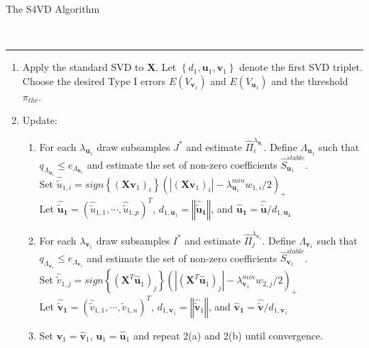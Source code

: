 \documentclass{bioinfo}
\begin{document}
\begin{methods}
\begin{bf}The S4VD Algorithm\end{bf}\\
\hspace{-0.1cm} 
\rule{8.5 cm}{1pt}
\begin{enumerate}
 \item Apply the standard SVD to $\mathbf{X}$. Let $\left\{ d_{1}, \mathbf{u}_{1}, \mathbf{v}_{1} \right\}$ denote the first SVD triplet. Choose the desired Type I errors $E(V_{\mathbf{v}_{1}})$ and $E(V_{\mathbf{u}_{1}})$ and the threshold $\pi_{thr}$.
 \item Update:
  \begin{enumerate}
   \item For each $\lambda_{\mathbf{u}_{1}}$ draw subsamples $J^{*}$ and estimate $\hat{\Pi}_{i}^{\lambda_{\mathbf{u}_{1}}}$.
	 Define $\Lambda_{\mathbf{u}_{1}}$ such that $q_{\Lambda_{\mathbf{u}_{1}}} \leq e_{\Lambda_{\mathbf{u}_{1}}}$ and estimate the set of non-zero coefficients
	 $\hat{S}_{\mathbf{u}_{1}}^{stable}$.\\
	 Set $\hat{\tilde{u}}_{1,i}=\textit{sign} \left\{(\mathbf{X}\mathbf{v}_{1})_{i} \right\} (|(\mathbf{X}\mathbf{v}_{1})_{i}|- \lambda^{min}_{\mathbf{u}_{1}}w_{1,i}/2)_{+} $ \\
	 Let $\mathbf{\hat{\tilde{u}}_{1}}=(\hat{\tilde{u}}_{1,1},\cdots,\hat{\tilde{u}}_{1,p})^{T}$,
	 $d_{1,\mathbf{u}_{1}}=\left\Vert \mathbf{\hat{\tilde{u}}_{1}} \right\Vert$, 
	 and $\mathbf{\hat{u}_{1}} =\mathbf{\hat{\tilde{u}}}/d_{1,\mathbf{u_{1}}}$
    \item 
	 For each $\lambda_{\mathbf{v}_{1}}$ draw subsamples $I^{*}$ and estimate $\hat{\Pi}_{j}^{\lambda_{\mathbf{v}_{1}}}$.
	 Define $\Lambda_{\mathbf{v}_{1}}$ such that $q_{\Lambda_{\mathbf{v}_{1}}} \leq e_{\Lambda_{\mathbf{v}_{1}}}$ and estimate
	 the set of non-zero coefficients $\hat{S}_{\mathbf{v}_{1}}^{stable}$. \\
	 Set $\hat{\tilde{v}}_{1,j}= \textit{sign}\left\{(\mathbf{X}^{T}\mathbf{\hat{u}}_{1})_{j}\right\}(|(\mathbf{X}^{T}\mathbf{\hat{u}}_{1})_{j}|-\lambda^{min}_{\mathbf{v}_{1}}w_{2,j}/2)_{+}$ \\
	 Let $\mathbf{\hat{\tilde{v}}_{1}}=(\hat{\tilde{v}}_{1,1},\cdots,\hat{\tilde{v}}_{1,n})^{T}$,
	 $d_{1,\mathbf{v}_{1}}=\left\Vert \mathbf{\hat{\tilde{v}}}_{1} \right\Vert$, 
	 and $\mathbf{\hat{v}_{1}} =\mathbf{\hat{\tilde{v}}}/d_{1,\mathbf{v}_{1}}$
   \item Set $\mathbf{v}_{1}=\mathbf{\hat{v}}_{1}$, $\mathbf{u}_{1}=\mathbf{\hat{u}}_{1}$ and repeat 2(a) and 2(b) until convergence.

\end{enumerate}
\end{enumerate}
\end{methods}
\end{document}
